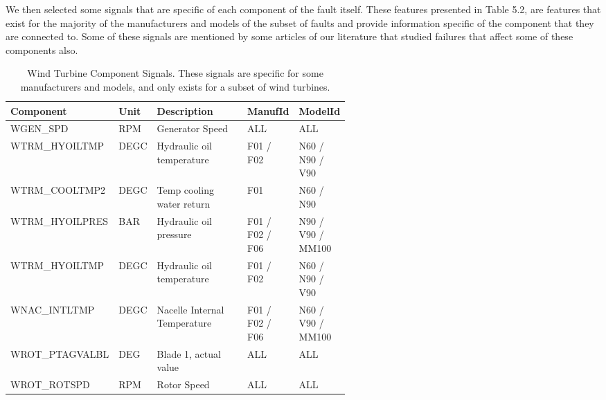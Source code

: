 We then selected some signals that are specific of each component of the fault itself. These features presented in Table 5.2, are features that exist for the majority of the manufacturers and models of the subset of faults and provide information specific of the component that they are connected to.
Some of these signals are mentioned by some articles of our literature that studied failures that affect some of these components also.

%

\begin{table}[!ht]
    \centering
    \begin{tabular}{|l|l|p{0.27\linewidth}|p{0.15\linewidth}|p{0.15\linewidth}|}
    \hline
        Component & Unit & Description & ManufId & ModelId \\ \hline
        WGEN\_SPD & RPM & Generator Speed & ALL & ALL \\ \hline
        WTRM\_HYOILTMP & DEGC & Hydraulic oil temperature & F01 / F02 & N60 / N90 / V90 \\ \hline
        WTRM\_COOLTMP2 & DEGC & Temp cooling water return & F01 & N60 / N90 \\ \hline
        WTRM\_HYOILPRES & BAR & Hydraulic oil pressure & F01 / F02 / F06 & N90 / V90 / MM100 \\ \hline
        WTRM\_HYOILTMP & DEGC & Hydraulic oil temperature & F01 / F02 & N60 / N90 / V90 \\ \hline
        WNAC\_INTLTMP & DEGC & Nacelle Internal Temperature & F01 / F02 / F06 & N60 / V90 / MM100 \\ \hline
        WROT\_PTAGVALBL & DEG & Blade 1, actual value & ALL & ALL \\ \hline
        WROT\_ROTSPD & RPM & Rotor Speed & ALL & ALL \\ \hline
    \end{tabular}
    \caption{Wind Turbine Component Signals. These signals are specific for some manufacturers and models, and only exists for a subset of wind turbines.}
    \label{ComponentSignals}
\end{table}


